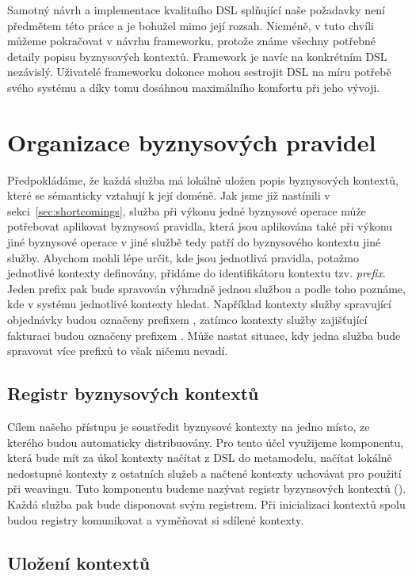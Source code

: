Samotný návrh a implementace kvalitního \gls{DSL} splňující naše požadavky není předmětem
této práce a je bohužel mimo její rozsah. Nicméně, v tuto chvíli můžeme pokračovat v návrhu
frameworku, protože známe všechny potřebné detaily popisu byznysových kontextů. Framework je
navíc na konkrétním \gls{DSL} nezávislý. Uživatelé frameworku dokonce mohou sestrojit
\gls{DSL} na míru potřebě svého systému a díky tomu dosáhnou maximálního komfortu při jeho vývoji.

\section{Organizace byznysových pravidel}

Předpokládáme, že každá služba má lokálně uložen popis byznysových kontextů, které se sémanticky vztahují
k její doméně. Jak jsme již nastínili v sekci~\ref{sec:shortcomings}, služba při výkonu jedné byznysové
operace může potřebovat aplikovat byznysová pravidla, která jsou aplikována také při výkonu jiné byznysové operace
v jiné službě \textendash\xspace tedy patří do byznysového kontextu jiné služby. Abychom mohli lépe
určit, kde jsou jednotlivá pravidla, potažmo jednotlivé kontexty definovány, přidáme do identifikátoru kontextu
tzv. \textit{prefix}. Jeden prefix pak bude spravován výhradně jednou službou a podle toho poznáme,
kde v systému jednotlivé kontexty hledat. Například kontexty služby spravující objednávky budou
označeny prefixem , zatímco kontexty služby zajišťující fakturaci budou označeny prefixem .
Může nastat situace, kdy jedna služba bude spravovat více prefixů \textendash\xspace to však ničemu nevadí.

\subsection{Registr byznysových kontextů}

Cílem našeho přístupu je soustředit byznysové kontexty na jedno místo, ze kterého budou
automaticky distribuovány. Pro tento účel využijeme komponentu, která bude mít
za úkol kontexty načítat z \gls{DSL} do metamodelu, načítat lokálně nedostupné kontexty
z ostatních služeb a načtené kontexty uchovávat pro použití při weavingu. Tuto komponentu
budeme nazývat registr byzynsových kontextů ().
Každá služba pak bude disponovat svým registrem. Při inicializaci kontextů spolu budou registry komunikovat
a vyměňovat si sdílené kontexty.

\subsection{Uložení kontextů}

